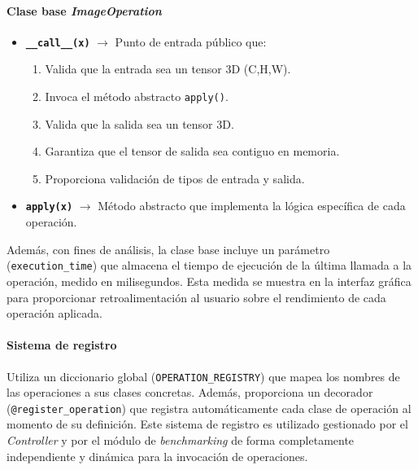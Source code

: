 \paragraph{Clase base \textit{ImageOperation}} \label{par:7_3_3_1_image_operation}

\begin{itemize}[noitemsep]
    \item \texttt{\textbf{\_\_call\_\_(x)}} $\rightarrow$ Punto de entrada público que:
    \begin{enumerate}
        \item Valida que la entrada sea un tensor 3D (C,H,W).
        \item Invoca el método abstracto \texttt{apply()}.
        \item Valida que la salida sea un tensor 3D.
        \item Garantiza que el tensor de salida sea contiguo en memoria.
        \item Proporciona validación de tipos de entrada y salida.
    \end{enumerate}
    \item \texttt{\textbf{apply(x)}} $\rightarrow$ Método abstracto que implementa la lógica específica 
    de cada operación.
\end{itemize}

Además, con fines de análisis, la clase base incluye un parámetro (\texttt{execution\_time}) que 
almacena el tiempo de ejecución de la última llamada a la operación, medido en milisegundos.
Esta medida se muestra en la interfaz gráfica para proporcionar retroalimentación al usuario 
sobre el rendimiento de cada operación aplicada.

\paragraph{Sistema de registro} \label{par:7_3_3_2_sistema_registro}
Utiliza un diccionario global (\texttt{OPERATION\_REGISTRY}) que mapea los nombres de las operaciones
a sus clases concretas. Además, proporciona un decorador (\texttt{@register\_operation}) que registra 
automáticamente cada clase de operación al momento de su definición. Este sistema de registro es 
utilizado gestionado por el \textit{Controller} y por el módulo de \textit{benchmarking} de forma 
completamente independiente y dinámica para la invocación de operaciones.

\newpage

